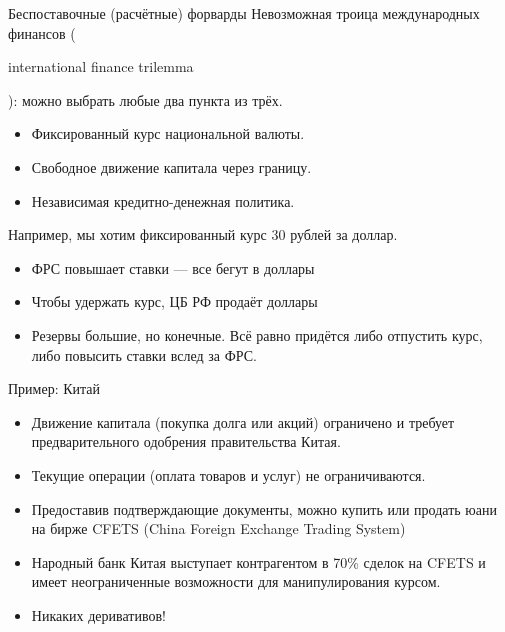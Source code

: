 \documentclass{beamer}
\newcommand{\en}[1]{\begin{otherlanguage}{english}#1\end{otherlanguage}}
\begin{document}
\begin{frame}{Беспоставочные (расчётные) форварды}
\justify
Невозможная троица международных финансов (\en{international finance trilemma}): можно выбрать любые два пункта из трёх.
\begin{itemize}
\item Фиксированный курс национальной валюты.
\item Свободное движение капитала через границу.
\item Независимая кредитно-денежная политика.
\end{itemize}

\justify
Например, мы хотим фиксированный курс 30 рублей за доллар.
\begin{itemize}
\justifying
\item ФРС повышает ставки --- все бегут в доллары
\item Чтобы удержать курс, ЦБ РФ продаёт доллары
\item Резервы большие, но конечные. Всё равно придётся либо отпустить курс, либо повысить ставки вслед за ФРС.
\end{itemize}
\end{frame}



\begin{frame}{Пример: Китай}
\begin{itemize}
\justifying
\item Движение капитала (покупка долга или акций) ограничено и требует предварительного одобрения правительства Китая.

\item Текущие операции (оплата товаров и услуг) не ограничиваются. 

\item Предоставив подтверждающие документы, можно купить или продать юани на бирже CFETS (China Foreign Exchange Trading System)

\item Народный банк Китая выступает контрагентом в 70\% сделок на CFETS и имеет неограниченные возможности для манипулирования курсом.

\item Никаких деривативов!
\end{itemize}
\end{frame}
\end{document}

